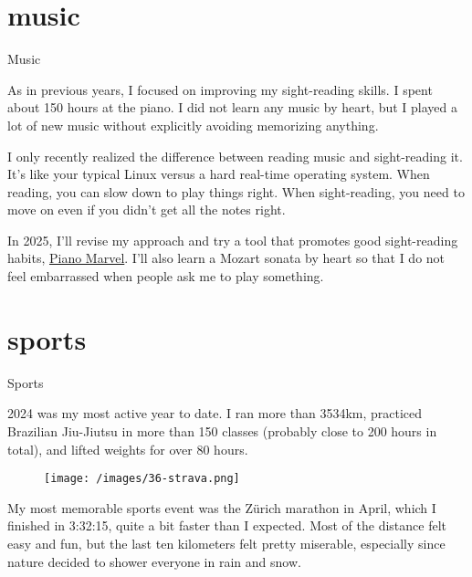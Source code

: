 \documentclass{article}
\begin{document}
\section{music}{Music}

As in previous years, I focused on improving my sight-reading skills.
I spent about 150 hours at the piano.
I did not learn any music by heart, but I played a lot of new music without explicitly avoiding memorizing anything.

I only recently realized the difference between reading music and sight-reading it.
It's like your typical Linux versus a hard real-time operating system.
When reading, you can slow down to play things right.
When sight-reading, you need to move on even if you didn't get all the notes right.

In 2025, I'll revise my approach and try a tool that promotes good sight-reading habits, \href{https://pianomarvel.com/}{Piano Marvel}.
I'll also learn a Mozart sonata by heart so that I do not feel embarrassed when people ask me to play something.

\section{sports}{Sports}

2024 was my most active year to date.
I ran more than 3534km, practiced Brazilian Jiu-Jiutsu in more than 150 classes (probably close to 200 hours in total), and lifted weights for over 80 hours.

\begin{figure}[medium-size,center]
\texttt{[image: /images/36-strava.png]}
\end{figure}

My most memorable sports event was the Zürich marathon in April, which I finished in 3:32:15, quite a bit faster than I expected.
Most of the distance felt easy and fun, but the last ten kilometers felt pretty miserable, especially since nature decided to shower everyone in rain and snow.

\begin{figure}
\end{figure}
\end{document}
